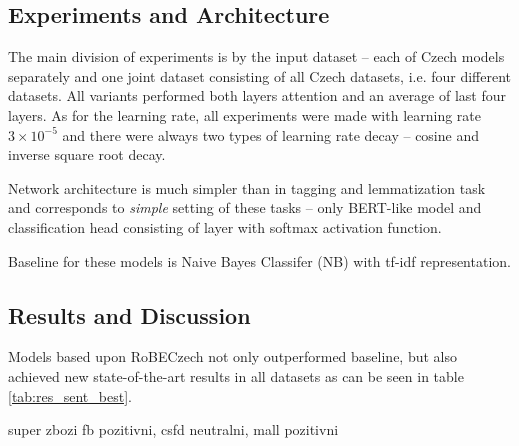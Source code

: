 \subsection{Experiments and Architecture}
The main division of experiments is by the input dataset -- each of Czech models separately and one joint dataset consisting of all Czech datasets, i.e. four different datasets. All variants performed both layers attention and an average of last four layers. As for the learning rate, all experiments were made with learning rate $3 \times 10^{-5}$ and there were always two types of learning rate decay -- cosine and inverse square root decay. 
\par
Network architecture is much simpler than in tagging and lemmatization task and corresponds to \textit{simple} setting of these tasks -- only BERT-like model and classification head consisting of layer with softmax activation function. 
\par 
Baseline for these models is Naive Bayes Classifer (NB) with tf-idf representation. 

\subsection{Results and Discussion}
Models based upon RoBECzech not only outperformed baseline, but also achieved new state-of-the-art results in all datasets as can be seen in table \ref{tab:res_sent_best}. %


super zbozi fb pozitivni, csfd neutralni, mall pozitivni




